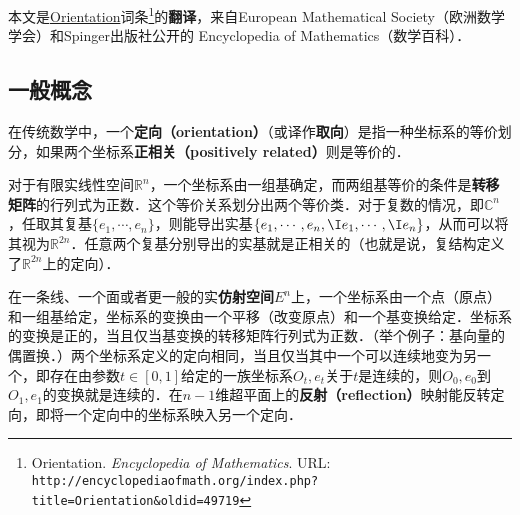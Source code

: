 
本文是\href{https://encyclopediaofmath.org/wiki/Orientation}{Orientation}词条\footnote{Orientation. \textsl{Encyclopedia of Mathematics}. URL: \lstinline|http://encyclopediaofmath.org/index.php?title=Orientation&oldid=49719|}的\textbf{翻译}，来自European Mathematical Society（欧洲数学学会）和Spinger出版社公开的 Encyclopedia of Mathematics（数学百科）．



\subsection{一般概念}

在传统数学中，一个\textbf{定向（orientation）}（或译作\textbf{取向}）是指一种坐标系的等价划分，如果两个坐标系\textbf{正相关（positively related）}则是等价的．


对于有限实线性空间$\mathbb{R}^n$，一个坐标系由一组基确定，而两组基等价的条件是\textbf{转移矩阵}的行列式为正数．这个等价关系划分出两个等价类．对于复数的情况，即$\mathbb{C}^n$，任取其复基$\{e_1, \cdots, e_n\}$，则能导出实基$\{e_1, \cdots, e_n, \I e_1, \cdots, \I e_n\}$，从而可以将其视为$\mathbb{R}^{2n}$．任意两个复基分别导出的实基就是正相关的（也就是说，复结构定义了$\mathbb{R}^{2n}$上的定向）．


在一条线、一个面或者更一般的实\textbf{仿射空间}$E^n$上，一个坐标系由一个点（原点）和一组基给定，坐标系的变换由一个平移（改变原点）和一个基变换给定．坐标系的变换是正的，当且仅当基变换的转移矩阵行列式为正数．（举个例子：基向量的偶置换．）两个坐标系定义的定向相同，当且仅当其中一个可以连续地变为另一个，即存在由参数$t\in[0, 1]$给定的一族坐标系$O_t, e_t$关于$t$是连续的，则$O_0, e_0$到$O_1, e_1$的变换就是连续的．在$n-1$维超平面上的\textbf{反射（reflection）}映射能反转定向，即将一个定向中的坐标系映入另一个定向．


